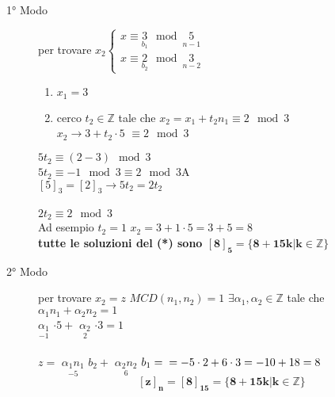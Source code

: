 \begin{description}
    \item[1° Modo] per trovare
        $x_2
        \begin{cases}
            x\equiv\underset{b_1}{3}\mod\underset{n-1}{5}\\
            x\equiv\underset{b_2}{2}\mod\underset{n-2}{3}
        \end{cases}
        $
        \begin{enumerate}
            \item $x_1=3$
            \item cerco $t_2\in\mathbb{Z}$ tale che $x_2=x_1+t_2n_1 \equiv 2\mod 3$\\
                {\color{blue}
                    $x_2\rightarrow 3+t_2\cdot 5$} $\equiv 2 \mod 3$
        \end{enumerate}
        $5t_2\equiv (2-3)\mod 3$\\
        $5t_2\equiv -1\mod 3\equiv 2 \mod 3$A\\
        $[5]_3 = [2]_3 \rightarrow 5t_2 = 2t_2$\\\\
        $2t_2\equiv 2\mod 3$\\
        Ad esempio $t_2=1$
        {\color{red}
            $x_2=3+1 \cdot 5 = 3 + 5 = 8 $\\
            \textbf{tutte le soluzioni del (*) sono 
            $\pmb{[8]_5=\{8+15k|k\in\mathbb{Z}\}}$} 
        }
    \item[2° Modo] per trovare $x_2=z$
        $MCD(n_1,n_2)=1$ $\exists \alpha_1,\alpha_2\in\mathbb{Z}$ tale che \\
        $\alpha_1n_1+\alpha_2n_2=1$\\
        {\color{red}
            $\underset{-1}{\alpha_1}$
        }
        $\cdot 5 +$
        {\color{red} 
            $\underset{2}{\alpha_2}$
        }
        $\cdot 3 = 1$ 
        \\
        \\
        $z=$
        {\color{red}
            $\underset{-5}{\alpha_1n_1}$
        }
        $b_2+$
        {\color{red}
            $\underset{6}{\alpha_2n_2}$
        }
        $b_1=\\
        =-5\cdot 2+6\cdot 3\\
        =-10+18=8$
        $$\pmb{[z]_n=[8]_{15}=\{8+15k|k\in\mathbb{Z}\}}$$
\end{description}













